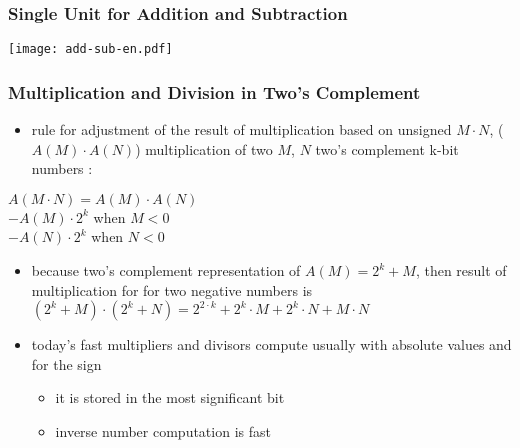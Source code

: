 \documentclass{beamer}
\begin{document}
\begin{frame}
\frametitle{Single Unit for Addition and Subtraction}


\begin{center}
\texttt{[image: add-sub-en.pdf]}
\end{center}

\end{frame}


\begin{frame}
\frametitle{Multiplication and Division in Two's Complement}

\begin{itemize}
\item rule for adjustment of the result of multiplication based on unsigned $M\cdot N$, ($A(M)\cdot A(N)$) multiplication of two $M$, $N$ two's complement k-bit numbers :

\end{itemize}
$A(M\cdot N) = A(M) \cdot A(N)$\\
\phantom{$A(M\cdot N)$ }$-A(M) \cdot 2^k$ \phantom{xxxxx} when $M<0$\\
\phantom{$A(M\cdot N)$ }$-A(N) \cdot 2^k$ \phantom{xxxxx} when $N<0$
\begin{itemize}
\item because two's complement representation of $A(M) = 2^k+M$, then result of multiplication for for two negative numbers is $(2^k+M)\cdot (2^k+N) = 2^{2\cdot k}+2^k \cdot M + 2^k \cdot N + M \cdot N$
\end{itemize}
\begin{itemize}
\item today's fast multipliers and divisors compute usually with absolute values and for the sign
\begin{itemize}
\item it is stored in the most significant bit
\item inverse number computation is fast
\end{itemize}
\end{itemize}
\end{frame}
\end{document}
